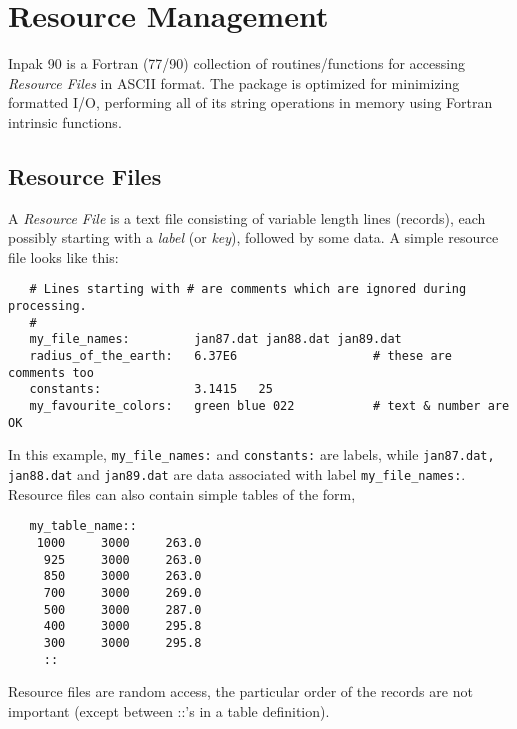%  
%  
%  
\section{Resource Management}
Inpak 90 is a Fortran (77/90) collection of routines/functions for 
accessing {\em Resource Files} in ASCII format. 
The package is optimized for minimizing formatted I/O, performing all of 
its string operations in memory using Fortran intrinsic functions.
%  
\subsection{Resource Files}
%
A {\em Resource File} is a text file consisting of variable length lines 
(records), each possibly starting with a {\em label} (or {\em key}), 
followed by some data. 
A simple resource file looks like this:
%
\begin{verbatim}
   # Lines starting with # are comments which are ignored during processing.
   #
   my_file_names:         jan87.dat jan88.dat jan89.dat
   radius_of_the_earth:   6.37E6                   # these are comments too
   constants:             3.1415   25
   my_favourite_colors:   green blue 022           # text & number are OK
\end{verbatim}
%
In this example, {\tt my\_file\_names:} and {\tt constants:}
are labels, while {\tt jan87.dat, jan88.dat} and {\tt jan89.dat} are
data associated with label {\tt my\_file\_names:}.
Resource files can also contain simple tables of the form,
%
\begin{verbatim}
   my_table_name::
    1000     3000     263.0   
     925     3000     263.0
     850     3000     263.0
     700     3000     269.0
     500     3000     287.0
     400     3000     295.8
     300     3000     295.8    
     ::
\end{verbatim}
% 
Resource files are random access, the particular order of the
records are not important (except between ::'s in a table definition).
%
